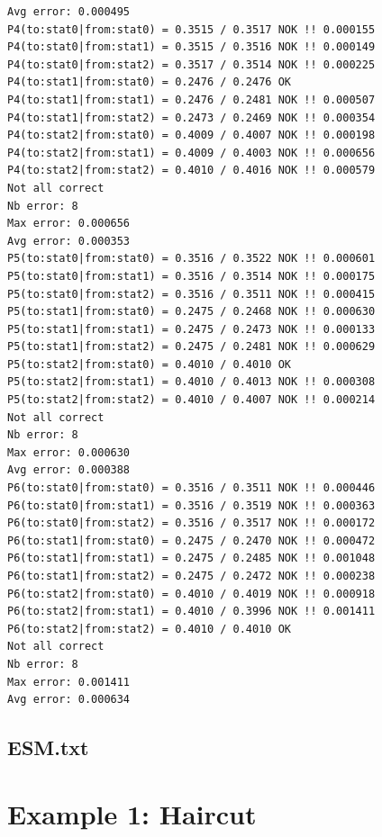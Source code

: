 \documentclass[12pt, a4paper]{article}
\begin{document}
\begin{scriptsize}
\begin{ttfamily}
\begin{lstlisting}
Avg error: 0.000495
P4(to:stat0|from:stat0) = 0.3515 / 0.3517 NOK !! 0.000155
P4(to:stat0|from:stat1) = 0.3515 / 0.3516 NOK !! 0.000149
P4(to:stat0|from:stat2) = 0.3517 / 0.3514 NOK !! 0.000225
P4(to:stat1|from:stat0) = 0.2476 / 0.2476 OK
P4(to:stat1|from:stat1) = 0.2476 / 0.2481 NOK !! 0.000507
P4(to:stat1|from:stat2) = 0.2473 / 0.2469 NOK !! 0.000354
P4(to:stat2|from:stat0) = 0.4009 / 0.4007 NOK !! 0.000198
P4(to:stat2|from:stat1) = 0.4009 / 0.4003 NOK !! 0.000656
P4(to:stat2|from:stat2) = 0.4010 / 0.4016 NOK !! 0.000579
Not all correct
Nb error: 8
Max error: 0.000656
Avg error: 0.000353
P5(to:stat0|from:stat0) = 0.3516 / 0.3522 NOK !! 0.000601
P5(to:stat0|from:stat1) = 0.3516 / 0.3514 NOK !! 0.000175
P5(to:stat0|from:stat2) = 0.3516 / 0.3511 NOK !! 0.000415
P5(to:stat1|from:stat0) = 0.2475 / 0.2468 NOK !! 0.000630
P5(to:stat1|from:stat1) = 0.2475 / 0.2473 NOK !! 0.000133
P5(to:stat1|from:stat2) = 0.2475 / 0.2481 NOK !! 0.000629
P5(to:stat2|from:stat0) = 0.4010 / 0.4010 OK
P5(to:stat2|from:stat1) = 0.4010 / 0.4013 NOK !! 0.000308
P5(to:stat2|from:stat2) = 0.4010 / 0.4007 NOK !! 0.000214
Not all correct
Nb error: 8
Max error: 0.000630
Avg error: 0.000388
P6(to:stat0|from:stat0) = 0.3516 / 0.3511 NOK !! 0.000446
P6(to:stat0|from:stat1) = 0.3516 / 0.3519 NOK !! 0.000363
P6(to:stat0|from:stat2) = 0.3516 / 0.3517 NOK !! 0.000172
P6(to:stat1|from:stat0) = 0.2475 / 0.2470 NOK !! 0.000472
P6(to:stat1|from:stat1) = 0.2475 / 0.2485 NOK !! 0.001048
P6(to:stat1|from:stat2) = 0.2475 / 0.2472 NOK !! 0.000238
P6(to:stat2|from:stat0) = 0.4010 / 0.4019 NOK !! 0.000918
P6(to:stat2|from:stat1) = 0.4010 / 0.3996 NOK !! 0.001411
P6(to:stat2|from:stat2) = 0.4010 / 0.4010 OK
Not all correct
Nb error: 8
Max error: 0.001411
Avg error: 0.000634
\end{lstlisting}
\end{ttfamily}
\end{scriptsize}

\subsection{ESM.txt}

\begin{scriptsize}
\begin{ttfamily}

\end{ttfamily}
\end{scriptsize}

\section{Example 1: Haircut}
\end{document}

